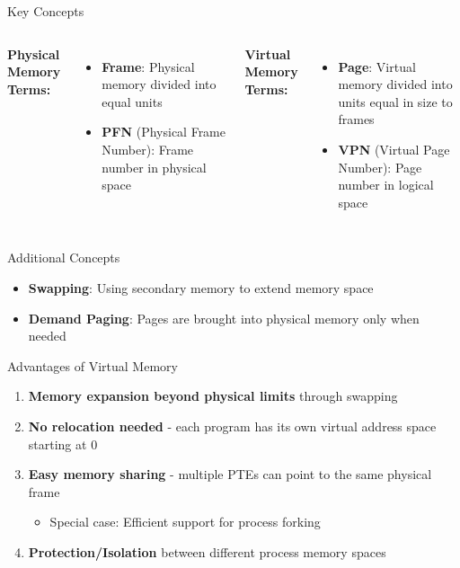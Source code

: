 \documentclass[aspectratio=169,12pt]{beamer}
\begin{document}
\begin{frame}{Key Concepts}
\begin{columns}[T]
\textbf{Physical Memory Terms:}
\begin{itemize}
\item \textbf{Frame}: Physical memory divided into equal units
\item \textbf{PFN} (Physical Frame Number): Frame number in physical space
\end{itemize}

\textbf{Virtual Memory Terms:}
\begin{itemize}
\item \textbf{Page}: Virtual memory divided into units equal in size to frames
\item \textbf{VPN} (Virtual Page Number): Page number in logical space
\end{itemize}
\end{columns}

\vspace{0.5cm}
\begin{block}{Additional Concepts}
\begin{itemize}
\item \textbf{Swapping}: Using secondary memory to extend memory space
\item \textbf{Demand Paging}: Pages are brought into physical memory only when needed
\end{itemize}
\end{block}
\end{frame}

\begin{frame}{Advantages of Virtual Memory}
\begin{enumerate}
\item \textbf{Memory expansion beyond physical limits} through swapping
\item \textbf{No relocation needed} - each program has its own virtual address space starting at 0
\item \textbf{Easy memory sharing} - multiple PTEs can point to the same physical frame
\begin{itemize}
  \item Special case: Efficient support for process forking
\end{itemize}
\item \textbf{Protection/Isolation} between different process memory spaces
\end{enumerate}
\end{frame}
\end{document}
